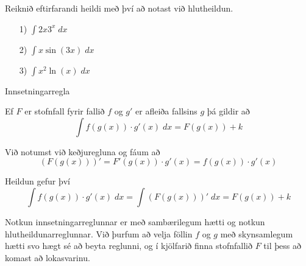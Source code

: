 \begin{æd}
Reiknið eftirfarandi heildi með því að notast við hlutheildun.
\begin{itemize}
\item[1)] $\displaystyle \int 2x3^{x}\; dx$

\item[2)] $\displaystyle \int x\sin(3x) \; dx$

\item[3)] $\displaystyle \int x^{2}\ln(x)\; dx$
\end{itemize}
\end{æd}

\begin{regla}{Innsetningarregla}

Ef $F$ er stofnfall fyrir fallið $f$ og $g'$ er afleiða fallsins $g$ þá gildir að
$$
\int f(g(x))\cdot g'(x)\;dx = F(g(x))+k
$$
\end{regla}

\begin{sonnun}
Við notumst við keðjuregluna og fáum að
$$
\left(F(g(x))\right)' = F'(g(x))\cdot g'(x) = f(g(x))\cdot g'(x)
$$

Heildun gefur því
$$
\int f(g(x))\cdot g'(x) \;dx = \int \left(F(g(x))\right)' \;dx = F(g(x))+k
$$
\end{sonnun}

\newpage

\begin{ath}
Notkun innsetningarreglunnar er með sambærilegum hætti og notkun hlutheildunarreglunnar. Við þurfum að velja föllin $f$ og $g$ með skynsamlegum hætti svo hægt sé að beyta reglunni, og í kjölfarið finna stofnfallið $F$ til þess að komast að lokasvarinu.
\end{ath}

